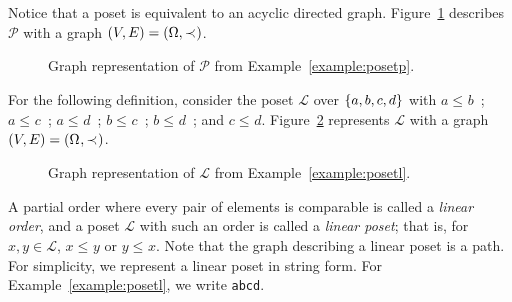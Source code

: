 \documentclass[12pt]{llncs}
\DeclarePairedDelimiter{\set}{\{}{\}}
\DeclarePairedDelimiter{\tuple}{(}{)}
\let\oldleq\leq
\renewcommand{\leq}[1][]{\oldleq_{#1}}
\newcommand{\poset}[1]{\mathcal{#1}}
\newcommand{\uni}[1][]{\Omega_{#1}}
\newcommand{\lin}[1]{\texttt{#1}}
\newcommand{\covered}[1][]{\prec_{#1}}
\begin{document}
Notice that a poset is equivalent to an acyclic directed graph. Figure~\ref{figure:posetp} describes $\poset{P}$ with a graph $\tuple{V,E} = \tuple{\Omega,\covered}$.

\begin{figure}[H]
    \centering
    \caption{Graph representation of $\poset{P}$ from Example~\ref{example:posetp}.}
    \label{figure:posetp}
\end{figure}

\begin{example}
    For the following definition, consider the poset $\poset{L}$ over $\set{a,b,c,d}$ with $a \leq b$\ ; $a \leq c$\ ; $a \leq d$\ ; $b \leq c$\ ; $b \leq d$\ ; and $c \leq d$. Figure~\ref{figure:posetl} represents $\poset{L}$ with a graph $\tuple{V,E} = \tuple{\uni,\covered}$.
    \label{example:posetl}
\end{example}

\begin{figure}[H]
    \centering
    \caption{Graph representation of $\poset{L}$ from Example~\ref{example:posetl}.}
    \label{figure:posetl}
\end{figure}

A partial order where every pair of elements is comparable is called a \emph{linear order}, and a poset $\poset{L}$ with such an order is called a \emph{linear poset}; that is, for $x, y \!\in\! \poset{L}$, $x \leq y$ or $y \leq x$. Note that the graph describing a linear poset is a path. For simplicity, we represent a linear poset in string form. For Example~\ref{example:posetl}, we write \lin{abcd}.
\end{document}

